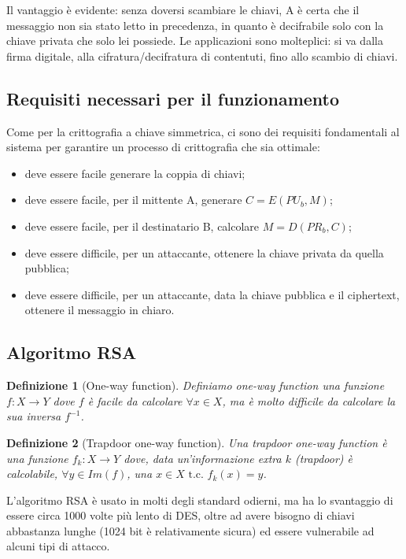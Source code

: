 \documentclass[a4paper, 10pt, twoside]{article}
\newtheorem{definit}{Definizione}[subsection]
\begin{document}
	Il vantaggio è evidente: senza doversi scambiare le chiavi, A è certa che il messaggio non sia stato letto in precedenza, in quanto è decifrabile solo con la chiave privata che solo lei possiede. Le applicazioni sono molteplici: si va dalla firma digitale, alla cifratura/decifratura di contentuti, fino allo scambio di chiavi.
	
	\subsection{Requisiti necessari per il funzionamento}
	Come per la crittografia a chiave simmetrica, ci sono dei requisiti fondamentali al sistema per garantire un processo di crittografia che sia ottimale: \begin{itemize}
		\item deve essere facile generare la coppia di chiavi;
		\item deve essere facile, per il mittente A, generare $C=E(PU_b, M)$;
		\item deve essere facile, per il destinatario B, calcolare $M=D(PR_b, C)$;
		\item deve essere difficile, per un attaccante, ottenere la chiave privata da quella pubblica;
		\item deve essere difficile, per un attaccante, data la chiave pubblica e il ciphertext, ottenere il messaggio in chiaro.
	\end{itemize}

	\subsection{Algoritmo RSA}
	\begin{definit}[One-way function]
		Definiamo one-way function una funzione $f:X \to Y$ dove $f$ è facile da calcolare $\forall x \in X$, ma è molto difficile da calcolare la sua inversa $f^{-1}$.
	\end{definit}

	\begin{definit}[Trapdoor one-way function]
		Una trapdoor one-way function è una funzione $f_k:X \to Y$ dove, data un'informazione extra $k$ (trapdoor) è calcolabile, $\forall y \in Im(f)$, una $x\in X \text{ t.c. } f_k(x)=y$.
	\end{definit}

	L'algoritmo RSA è usato in molti degli standard odierni, ma ha lo svantaggio di essere circa 1000 volte più lento di DES, oltre ad avere bisogno di chiavi abbastanza lunghe (1024 bit è relativamente sicura) ed essere vulnerabile ad alcuni tipi di attacco.
	
\end{document}
